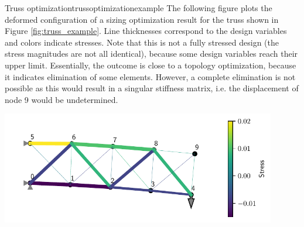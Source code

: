 \begin{example}{Truss optimization}{trussoptimizationexample}
    The following figure plots the deformed configuration of a sizing optimization result for the truss shown in Figure \ref{fig:truss_example}. Line thicknesses correspond to the design variables and colors indicate stresses. Note that this is not a fully stressed design (the stress magnitudes are not all identical), because some design variables reach their upper limit. Essentially, the outcome is close to a topology optimization, because it indicates elimination of some elements. However, a complete elimination is not possible as this would result in a singular stiffness matrix, i.e. the displacement of node 9 would be undetermined. 

    \begin{center}
        \includegraphics[width=0.9\textwidth]{figures/truss_sample_optimized.pdf} 
    \end{center}
\end{example}

